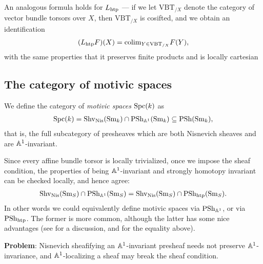 \documentclass[11pt,openany]{book}
\renewcommand{\Pre}{\mathrm{PSh}}
\begin{document}
\begin{remark} An analogous formula holds for $L_{\mathrm{htp}}$ --- if we let $\text{VBT}_{/X}$ denote the category of vector bundle torsors over $X$, then $\text{VBT}_{/X}$ is cosifted, and we obtain an identification
\begin{equation}\label{eqn:formula-Lhtp}
\begin{aligned}
    (L_{\mathrm{htp}} F)(X) = \mathrm{colim}_{Y\in \text{VBT}_{/X}}F(Y),
\end{aligned}
\end{equation}
with the same properties that it preserves finite products and is locally cartesian \cite[3.5]{Hoyois6}
\end{remark}


\subsection{The category of motivic spaces}


\begin{definition} We define the category of \textit{motivic spaces} $\mathrm{Spc}(k)$ as
\begin{align*}
    \Spc(k) = \Shv_\Nis(\Sm_k) \cap \Pre_{\A^1}(\Sm_k) \subseteq \Pre(\Sm_k),
\end{align*}
that is, the full subcategory of presheaves which are both Nisnevich sheaves and are $\mathbb{A}^1$-invariant.
\end{definition}

\begin{remark} Since every affine bundle torsor is locally trivialized, once we impose the sheaf condition, the properties of being $\mathbb{A}^1$-invariant and strongly homotopy invariant can be checked locally, and hence agree:
\begin{align*}
    \mathrm{Shv}_{\mathrm{Nis}}(\mathrm{Sm}_S) \cap \mathrm{PSh}_{\mathbb{A}^1}(\mathrm{Sm}_S) = \mathrm{Shv}_{\mathrm{Nis}}(\mathrm{Sm}_S) \cap \mathrm{PSh}_{\mathrm{htp}}(\mathrm{Sm}_S).
\end{align*}
In other words we could equivalently define motivic spaces via $\Pre_{\A^1}$, or via $\Pre_\htp$. The former is more common, although the latter has some nice advantages (see \cite[p.~204]{Hoyois6} for a discussion, and \cite[3.13]{Hoyois6} for the equality above).
\end{remark}


 
\textbf{Problem}: Nisnevich sheafifying an $\mathbb{A}^1$-invariant presheaf needs not preserve $\mathbb{A}^1$-invariance, and $\mathbb{A}^1$-localizing a sheaf may break the sheaf condition. 
\end{document}
